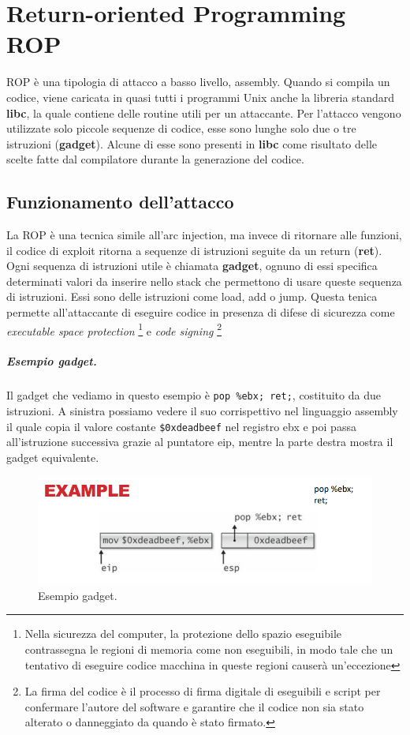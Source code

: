 
\chapter{Return-oriented Programming ROP}
ROP è una tipologia di attacco a basso livello, assembly. Quando si compila un codice, viene caricata in quasi tutti i programmi Unix anche la libreria standard \textbf{libc}, la quale contiene delle routine utili per un attaccante. Per l'attacco vengono utilizzate solo piccole sequenze di codice, esse sono lunghe solo due o tre istruzioni (\textbf{gadget}). Alcune di esse sono presenti in \textbf{libc} come risultato delle scelte fatte dal compilatore durante la generazione del codice.

\section{Funzionamento dell'attacco}
La ROP è una tecnica simile all'arc injection, ma invece di ritornare alle funzioni, il codice di exploit ritorna a sequenze di istruzioni seguite da un return (\textbf{ret}).
Ogni sequenza di istruzioni utile è chiamata \textbf{gadget},
ognuno di essi specifica determinati valori da inserire nello stack che permettono di usare queste sequenza di istruzioni.
Essi sono delle istruzioni come load, add o jump. Questa tenica permette all'attaccante di eseguire codice in presenza di difese di sicurezza
come \textit{executable space protection}
\footnote{ Nella sicurezza del computer, la protezione dello spazio eseguibile contrassegna le regioni di memoria come non eseguibili,
    in modo tale che un tentativo di eseguire codice macchina in queste regioni causerà un'eccezione} e \textit{code signing}
\footnote{La firma del codice è il processo di firma digitale di eseguibili e script per confermare l'autore del software e garantire che
    il codice non sia stato alterato o danneggiato da quando è stato firmato.}

\paragraph{Esempio gadget.} Il gadget che vediamo in questo esempio è \verb|pop %ebx; ret;|, costituito da due istruzioni. A sinistra possiamo vedere il suo corrispettivo nel linguaggio assembly il quale copia il valore costante \verb|$0xdeadbeef| nel registro ebx e poi passa all'istruzione successiva grazie al puntatore eip, mentre la parte destra mostra il gadget equivalente.

\begin{figure}[H]
    \centering
    \includegraphics[width=13cm, keepaspectratio]{capitoli/secure_coding/img/cap_3/es_gadget.png}
    \caption{Esempio gadget.}\label{fig:es_gadget}
\end{figure}

